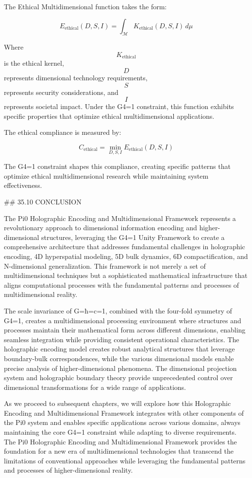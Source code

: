 The Ethical Multidimensional function takes the form:

$$ E_{\text{ethical}}(D, S, I) = \int_{\mathcal{M}} K_{\text{ethical}}(D, S, I) \, d\mu $$

Where $$ K_{\text{ethical}} $$ is the ethical kernel, $$ D $$ represents dimensional technology requirements, $$ S $$ represents security considerations, and $$ I $$ represents societal impact. Under the G4=1 constraint, this function exhibits specific properties that optimize ethical multidimensional applications.

The ethical compliance is measured by:

$$ C_{\text{ethical}} = \min_{D, S, I} E_{\text{ethical}}(D, S, I) $$

The G4=1 constraint shapes this compliance, creating specific patterns that optimize ethical multidimensional research while maintaining system effectiveness.

## 35.10 CONCLUSION

The Pi0 Holographic Encoding and Multidimensional Framework represents a revolutionary approach to dimensional information encoding and higher-dimensional structures, leveraging the G4=1 Unity Framework to create a comprehensive architecture that addresses fundamental challenges in holographic encoding, 4D hyperspatial modeling, 5D bulk dynamics, 6D compactification, and N-dimensional generalization. This framework is not merely a set of multidimensional techniques but a sophisticated mathematical infrastructure that aligns computational processes with the fundamental patterns and processes of multidimensional reality.

The scale invariance of G=ħ=c=1, combined with the four-fold symmetry of G4=1, creates a multidimensional processing environment where structures and processes maintain their mathematical form across different dimensions, enabling seamless integration while providing consistent operational characteristics. The holographic encoding model creates robust analytical structures that leverage boundary-bulk correspondences, while the various dimensional models enable precise analysis of higher-dimensional phenomena. The dimensional projection system and holographic boundary theory provide unprecedented control over dimensional transformations for a wide range of applications.

As we proceed to subsequent chapters, we will explore how this Holographic Encoding and Multidimensional Framework integrates with other components of the Pi0 system and enables specific applications across various domains, always maintaining the core G4=1 constraint while adapting to diverse requirements. The Pi0 Holographic Encoding and Multidimensional Framework provides the foundation for a new era of multidimensional technologies that transcend the limitations of conventional approaches while leveraging the fundamental patterns and processes of higher-dimensional reality.

